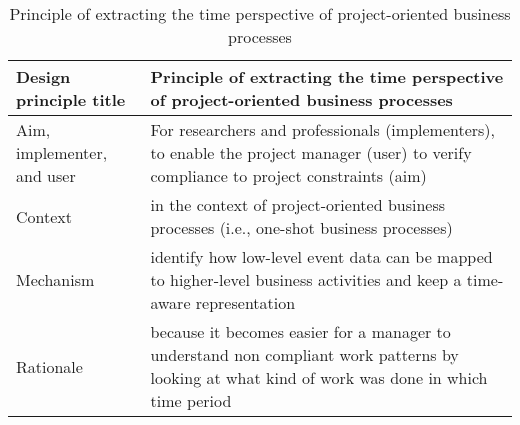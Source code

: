\begin{table}[h]
	\centering
	\caption{Principle of extracting the time perspective of project-oriented business processes}
	\label{tab:time-principle}
	\begin{tabular}{@{}lp{8cm}@{}}
		\toprule
		\textbf{Design principle title}     & \textbf{Principle of extracting the time perspective of project-oriented business processes}  \\            
		\midrule                                              
		Aim, implementer, and user & {For researchers and professionals (implementers), to enable the project manager (user) to verify compliance to project constraints (aim)}        \\
		Context                    & {in the context of project-oriented business processes (i.e., one-shot business processes)}                                                       \\
		Mechanism                  & {identify how low-level event data can be mapped to higher-level business activities and keep a time-aware representation}                        \\
		Rationale                  & {because it becomes easier for a manager to understand non compliant work patterns by looking at what kind of work was done in which time period} \\ \bottomrule
	\end{tabular}
\end{table}
